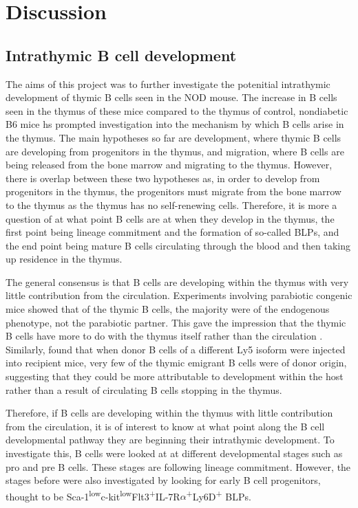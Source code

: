 
\chapter{Discussion}

\section{Intrathymic B cell development}
The aims of this project was to further investigate the potenitial intrathymic development of thymic B cells seen in the NOD mouse.
The increase in B cells seen in the thymus of these mice compared to the thymus of control, nondiabetic B6 mice hs prompted investigation into the mechanism by which B cells arise in the thymus.
The main hypotheses so far are development, where thymic B cells are developing from progenitors in the thymus, and migration, where B cells are being released from the bone marrow and migrating to the thymus.
However, there is overlap between these two hypotheses as, in order to develop from progenitors in the thymus, the progenitors must migrate from the bone marrow to the thymus as the thymus has no self-renewing cells.
Therefore, it is more a question of at what point B cells are at when they develop in the thymus, the first point being lineage commitment and the formation of so-called BLPs, and the end point being mature B cells circulating through the blood and then taking up residence in the thymus.

The general consensus is that B cells are developing within the thymus with very little contribution from the circulation.
Experiments involving parabiotic congenic mice showed that of the thymic B cells, the majority were of the endogenous phenotype, not the parabiotic partner. 
This gave the impression that the thymic B cells have more to do with the thymus itself rather than the circulation \citep{Perera2013}.
Similarly, \citet{Akashi2000} found that when donor B cells of a different Ly5 isoform were injected into recipient mice, very few of the thymic emigrant B cells were of donor origin, suggesting that they could be more attributable to development within the host rather than a result of circulating B cells stopping in the thymus.

Therefore, if B cells are developing within the thymus with little contribution from the circulation, it is of interest to know at what point along the B cell developmental pathway they are beginning their intrathymic development.
To investigate this, B cells were looked at at different developmental stages such as pro and pre B cells.
These stages are following lineage commitment.
However, the stages before were also investigated by looking for early B cell progenitors, thought to be Sca-1\textsuperscript{low}c-kit\textsuperscript{low}Flt3\textsuperscript{+}IL-7R$\alpha$\textsuperscript{+}Ly6D\textsuperscript{+} BLPs.

